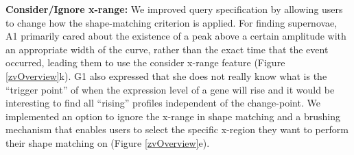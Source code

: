 \par \textbf{Consider/Ignore x-range:} We improved query specification by allowing users to change how the shape-matching criterion is applied. For finding supernovae, A1 primarily cared about the existence of a peak above a certain amplitude with an appropriate width of the curve, rather than the exact time that the event occurred, leading them to use the consider x-range feature (Figure \ref{zvOverview}k). G1 also expressed that she does not really know what is the ``trigger point'' of when the expression level of a gene will rise and it would be interesting to find all ``rising'' profiles independent of the change-point.  We implemented an option to ignore the x-range in shape matching and a brushing mechanism that enables users to select the specific x-region they want to perform their shape matching on (Figure \ref{zvOverview}e). 
